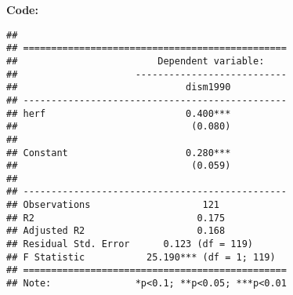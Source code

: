 \documentclass[
]{article}
\newenvironment{Shaded}{\begin{snugshade}}{\end{snugshade}}
\newcommand{\AttributeTok}[1]{\textcolor[rgb]{0.13,0.29,0.53}{#1}}
\newcommand{\ConstantTok}[1]{\textcolor[rgb]{0.56,0.35,0.01}{#1}}
\newcommand{\FunctionTok}[1]{\textcolor[rgb]{0.13,0.29,0.53}{\textbf{#1}}}
\newcommand{\NormalTok}[1]{#1}
\newcommand{\OtherTok}[1]{\textcolor[rgb]{0.56,0.35,0.01}{#1}}
\newcommand{\SpecialCharTok}[1]{\textcolor[rgb]{0.81,0.36,0.00}{\textbf{#1}}}
\newcommand{\StringTok}[1]{\textcolor[rgb]{0.31,0.60,0.02}{#1}}
\begin{document}
\textbf{Code:}

\begin{Shaded}
\end{Shaded}

\begin{verbatim}
## 
## ===============================================
##                         Dependent variable:    
##                     ---------------------------
##                              dism1990          
## -----------------------------------------------
## herf                         0.400***          
##                               (0.080)          
##                                                
## Constant                     0.280***          
##                               (0.059)          
##                                                
## -----------------------------------------------
## Observations                    121            
## R2                             0.175           
## Adjusted R2                    0.168           
## Residual Std. Error      0.123 (df = 119)      
## F Statistic           25.190*** (df = 1; 119)  
## ===============================================
## Note:               *p<0.1; **p<0.05; ***p<0.01
\end{verbatim}

\begin{Shaded}
\end{Shaded}

\clearpage
\end{document}
